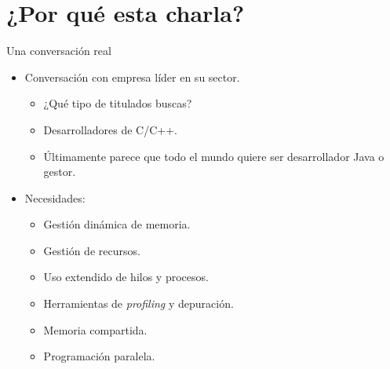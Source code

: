 \section{¿Por qué esta charla?}

\begin{frame}[t]{Una conversación real}
  \begin{itemize}
    \item Conversación con empresa líder en su sector.
      \begin{itemize}
        \item ¿Qué tipo de titulados buscas?
        \item Desarrolladores de C/C++.
        \item Últimamente parece que todo el mundo quiere ser desarrollador Java o gestor.
      \end{itemize}
    \item Necesidades:
      \begin{itemize}
        \item Gestión dinámica de memoria.
        \item Gestión de recursos.
        \item Uso extendido de hilos y procesos.
        \item Herramientas de \emph{profiling} y depuración.
        \item Memoria compartida.
        \item Programación paralela.
      \end{itemize}
  \end{itemize}
\end{frame}

